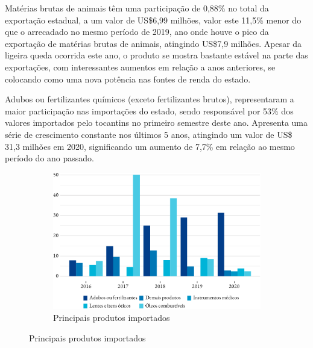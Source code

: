 \par Matérias brutas de animais têm uma participação de 0,88\% no total da exportação estadual, a um valor de US\$6,99 milhões, valor este 11,5\% menor do que o arrecadado no mesmo período de 2019, ano onde houve o pico da exportação de matérias brutas de animais, atingindo US\$7,9 milhões. Apesar da ligeira queda ocorrida este ano, o produto se mostra bastante estável na parte das exportações, com interessantes aumentos em relação a anos anteriores, se colocando como uma nova potência nas fontes de renda do estado.


\par Adubos ou fertilizantes químicos (exceto fertilizantes brutos), representaram a maior participação nas importações do estado, sendo responsável por 53\% dos valores importados pelo tocantins no primeiro semestre deste ano. Apresenta uma série de crescimento constante nos últimos 5 anos, atingindo um valor de US\$ 31,3 milhões em 2020, significando um aumento de 7,7\% em relação ao mesmo período do ano passado.

\begin{figure}[!h]
	\begin{subfigure}{\linewidth}
		\caption{Principais produtos importados}
		\includegraphics{fig/produtos_import-1.pdf}
	\end{subfigure}
\end{figure}

